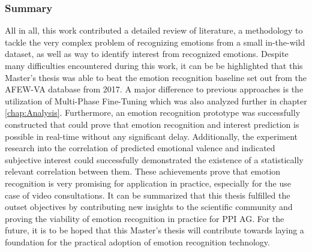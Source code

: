 \subsubsection{Summary}
All in all, this work contributed a detailed review of literature, a methodology to tackle the very complex problem of recognizing emotions from a small in-the-wild  dataset, as well as way to identify interest from recognized emotions. Despite many difficulties encountered during this work, it can be be highlighted that this Master's thesis was able to beat the emotion recognition baseline set out from the AFEW-VA database from 2017. A major difference to previous approaches is the utilization of Multi-Phase Fine-Tuning which was also analyzed further in chapter \ref{chap:Analysis}.
\newline\newline
Furthermore, an emotion recognition prototype was successfully constructed that could prove that emotion recognition and interest prediction is possible in real-time without any significant delay. Additionally, the experiment research into the correlation of predicted emotional valence and indicated subjective interest could successfully demonstrated the existence of a statistically relevant correlation between them. These achievements prove that emotion recognition is very promising for application in practice, especially for the use case of video consultations.
\newline\newline
It can be summarized that this thesis fulfilled the outset objectives by contributing new insights to the scientific community and proving the viability of emotion recognition in practice for PPI AG. For the future, it is to be hoped that this Master's thesis will contribute towards laying a foundation for the practical adoption of emotion recognition technology.

